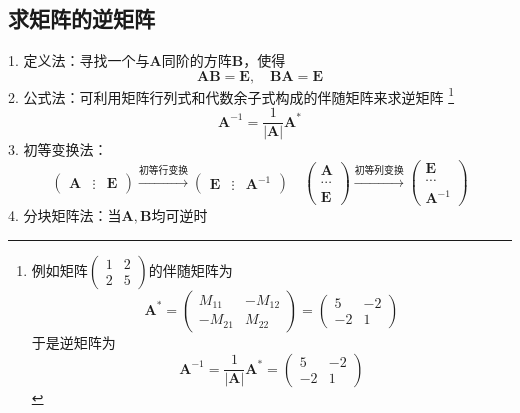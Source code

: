 \subsection{求矩阵的逆矩阵}
1. 定义法：寻找一个与$\boldsymbol{A}$同阶的方阵$\boldsymbol{B}$，使得
$$
    \boldsymbol{AB}=\boldsymbol{E}
    ,\quad
    \boldsymbol{BA}=\boldsymbol{E}
$$
2. 公式法：可利用矩阵行列式和代数余子式构成的伴随矩阵来求逆矩阵 \footnote{
    例如矩阵$\begin{pmatrix} 1 & 2 \\ 2 & 5 \end{pmatrix}$的伴随矩阵为
    $$
        \boldsymbol{A}^* = \begin{pmatrix}
            M_{11}  & -M_{12} \\
            -M_{21} & M_{22}
        \end{pmatrix} = \begin{pmatrix}
            5  & -2 \\
            -2 & 1
        \end{pmatrix}
    $$
    于是逆矩阵为
    $$
        \boldsymbol{A}^{-1}
        =\frac{1}{|\boldsymbol{A}|}\boldsymbol{A}^*
        =\begin{pmatrix}
            5  & -2 \\
            -2 & 1
        \end{pmatrix}
    $$
}
$$
    \boldsymbol{A}^{-1} = \frac{1}{|\boldsymbol{A}|}\boldsymbol{A}^*
$$
3. 初等变换法：
$$
    \begin{pmatrix}
        \boldsymbol{A} & \vdots & \boldsymbol{E}
    \end{pmatrix}
    \xrightarrow[]{\text{初等行变换}}
    \begin{pmatrix}
        \boldsymbol{E} & \vdots & \boldsymbol{A}^{-1}
    \end{pmatrix}
    \quad
    \begin{pmatrix}
        \boldsymbol{A} \\
        \cdots         \\
        \boldsymbol{E}
    \end{pmatrix}
    \xrightarrow[]{\text{初等列变换}}
    \begin{pmatrix}
        \boldsymbol{E} \\
        \cdots         \\
        \boldsymbol{A}^{-1}
    \end{pmatrix}
$$
4. 分块矩阵法：当$\boldsymbol{A}, \boldsymbol{B}$均可逆时
